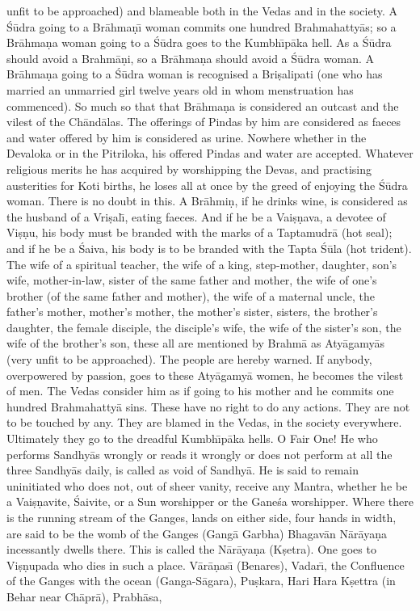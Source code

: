 unfit to be approached) and blameable both in the Vedas and in the society. A \'S\=udra going to a Br\=ahma\d{n}\={\i} woman commits one hundred Brahmahatty\=as; so a Br\=ahma\d{n}a woman going to a \'S\=udra goes to the Kumbh\={\i}p\=aka hell. As a \'S\=udra should avoid a Brahm\=a\d{n}i, so a Br\=ahma\d{n}a should avoid a \'S\=udra woman. A Br\=ahma\d{n}a going to a \'S\=udra woman is recognised a Bri\d{s}alipati (one who has married an unmarried girl twelve years old in whom menstruation has commenced). So much so that that Br\=ahma\d{n}a is considered an outcast and the vilest of the Ch\=and\=alas. The offerings of Pindas by him are considered as faeces and water offered by him is considered as urine. Nowhere whether in the Devaloka or in the Pitriloka, his offered Pindas and water are accepted. Whatever religious merits he has acquired by worshipping the Devas, and practising austerities for Koti births, he loses all at once by the greed of enjoying the \'S\=udra woman. There is no doubt in this. A Br\=ahmi\d{n}, if he drinks wine, is considered as the husband of a Vri\d{s}al\={\i}, eating faeces. And if he be a Vai\d{s}\d{n}ava, a devotee of Vi\d{s}\d{n}u, his body must be branded with the marks of a Taptamudr\=a (hot seal); and if he be a \'Saiva, his body is to be branded with the Tapta \'S\=ula (hot trident). The wife of a spiritual teacher, the wife of a king, step-mother, daughter, son's wife, mother-in-law, sister of the same father and mother, the wife of one's brother (of the same father and mother), the wife of a maternal uncle, the father's mother, mother's mother, the mother's sister, sisters, the brother's daughter, the female disciple, the disciple's wife, the wife of the sister's son, the wife of the brother's son, these all are mentioned by Brahm\=a as Aty\=agamy\=as (very unfit to be approached). The people are hereby warned. If anybody, overpowered by passion, goes to these Aty\=agamy\=a women, he becomes the vilest of men. The Vedas consider him as if going to his mother and he commits one hundred Brahmahatty\=a sins. These have no right to do any actions. They are not to be touched by any. They are blamed in the Vedas, in the society everywhere. Ultimately they go to the dreadful Kumbh\={\i}p\=aka hells. O Fair One! He who performs Sandhy\=as wrongly or reads it wrongly or does not perform at all the three Sandhy\=as daily, is called as void of Sandhy\=a. He is said to remain uninitiated who does not, out of sheer vanity, receive any Mantra, whether he be a Vai\d{s}\d{n}avite, \'Saivite, or a Sun worshipper or the Gane\'sa worshipper. Where there is the running stream of the Ganges, lands on either side, four hands in width, are said to be the womb of the Ganges (Gang\=a Garbha) Bhagav\=an N\=ar\=aya\d{n}a incessantly dwells there. This is called the N\=ar\=aya\d{n}a (K\d{s}etra). One goes to Vi\d{s}\d{n}upada who dies in such a place. V\=ar\=a\d{n}as\={\i} (Benares), Vadar\={\i}, the Confluence of the Ganges with the ocean (Ganga-S\=agara), Pu\d{s}kara, Hari Hara K\d{s}ettra (in Behar near Ch\=apr\=a), Prabh\=asa,

